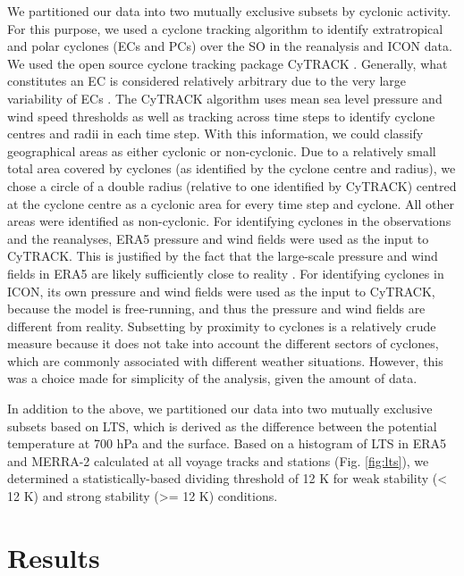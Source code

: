 \documentclass[12pt,a4paper]{article}
\begin{document}
We partitioned our data into two mutually exclusive subsets by cyclonic
activity. For this purpose, we used a cyclone tracking algorithm to identify
extratropical and polar cyclones (ECs and PCs) over the SO in the reanalysis
and ICON data. We used the open source cyclone tracking package CyTRACK
\citep{perez-alarcon2024}.  Generally, what constitutes an EC is considered
relatively arbitrary due to the very large variability of ECs \citep{neu2013}.
The CyTRACK algorithm uses mean sea level pressure and wind speed
thresholds as well as tracking across time steps to identify cyclone centres
and radii in each time step. With this information, we could classify
geographical areas as either cyclonic or non-cyclonic. Due to a relatively
small total area covered by cyclones (as identified by the cyclone centre and
radius), we chose a circle of a double radius (relative to one identified by
CyTRACK) centred at the cyclone centre as a cyclonic area for every time step
and cyclone. All other areas were identified as non-cyclonic. For identifying
cyclones in the observations and the reanalyses, ERA5 pressure and wind fields
were used as the input to CyTRACK.  This is justified by the fact that the
large-scale pressure and wind fields in ERA5 are likely sufficiently close to
reality \cite{mcerlich2023}. For identifying cyclones in ICON, its own pressure and wind fields
were used as the input to CyTRACK, because the model is free-running, and thus
the pressure and wind fields are different from reality. Subsetting by
proximity to cyclones is a relatively crude measure because it does not take
into account the different sectors of cyclones, which are commonly associated
with different weather situations. However, this was a choice made for
simplicity of the analysis, given the amount of data.

In addition to the above, we partitioned our data into two mutually exclusive
subsets based on LTS, which is derived as the difference between the potential
temperature at 700 hPa and the surface.  Based on a histogram of LTS in ERA5
and MERRA-2 calculated at all voyage tracks and stations (Fig.  \ref{fig:lts}),
we determined a statistically-based dividing threshold of 12 K for weak
stability (< 12 K) and strong stability (>= 12 K) conditions.

\section{Results}
\label{sec:results}
\end{document}
